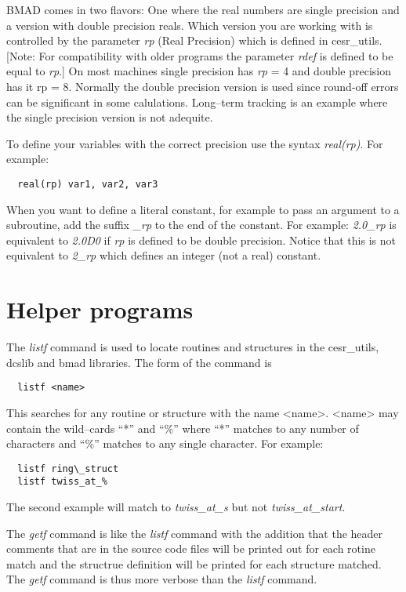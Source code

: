 \documentclass{book}
\begin{document}
BMAD comes in two flavors: One where the real numbers are single
precision and a version with double precision reals. Which version you
are working with is controlled by the parameter {\it rp} (Real Precision)
which is defined in cesr\_utils. [Note: For compatibility with older
programs the parameter {\it rdef} is defined to be equal to {\it rp}.]  On most
machines single precision has {\it rp} = 4 and double precision has {it rp} =
8. Normally the double precision version is used since round-off
errors can be significant in some calulations. Long--term tracking is
an example where the single precision version is not adequite. 

To define your variables with the correct precision use the syntax
{\it real(rp)}. For example:
\begin{verbatim}
  real(rp) var1, var2, var3
\end{verbatim}
When you want to define a literal constant, for example to pass an
argument to a subroutine, add the suffix {\it \_rp} to the end of the
constant. For example: {\it 2.0\_rp} is equivalent to {\it 2.0D0} if
{\it rp} is defined to be double precision. Notice that this is not
equivalent to {\it 2\_rp} which defines an integer (not a real) constant.


\section{Helper programs}

The {\it listf} command is used to locate routines and structures in
the cesr\_utils, dcslib and bmad libraries. The form of the command is
\begin{verbatim}
  listf <name>
\end{verbatim}
This searches for any routine or structure with the name
<name>. <name> may contain the wild--cards ``*'' and ``\%'' where
``*'' matches to any number of characters and ``\%'' matches to any
single character. For example:
\begin{verbatim}
  listf ring\_struct
  listf twiss_at_%
\end{verbatim}
The second example will match to {\it twiss\_at\_s} but not {\it
twiss\_at\_start}.

The {\it getf} command is like the {\it listf} command with the
addition that the header comments that are in the source code files
will be printed out for each rotine match and the structrue definition
will be printed for each structure matched. The {\it getf} command is
thus more verbose than the {\it listf} command.
\end{document}
